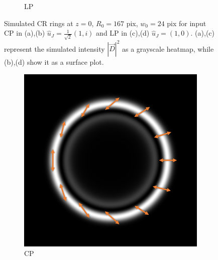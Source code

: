 \documentclass[11pt, a4paper, twoside]{article} %
\begin{document}
\begin{figure}[h!]
\begin{subfigure}[b]{0.25\linewidth}
     \caption{LP }
     \end{subfigure}
    \caption{Simulated CR rings at $z=0$, $R_0=167$ pix, $w_0=24$ pix for input CP in (a),(b) $\hat{u}_J=\frac{1}{\sqrt{2}}(1,i)$ and LP in (c),(d) $\hat{u}_J=(1,0)$. (a),(c) represent the simulated intensity $|\vec{D}|^2$ as a grayscale heatmap, while (b),(d) show it as a surface plot.}
        \label{fig:simul1}
\end{figure}

\begin{figure}[h!] 
     \centering 
    \begin{subfigure}[b]{0.245\linewidth}
    \includegraphics[width=\linewidth]{simul21.PNG}
    \caption{CP }
     \end{subfigure}
 \begin{subfigure}[b]{0.245\linewidth}

\end{subfigure}
\end{figure}
\end{document}
